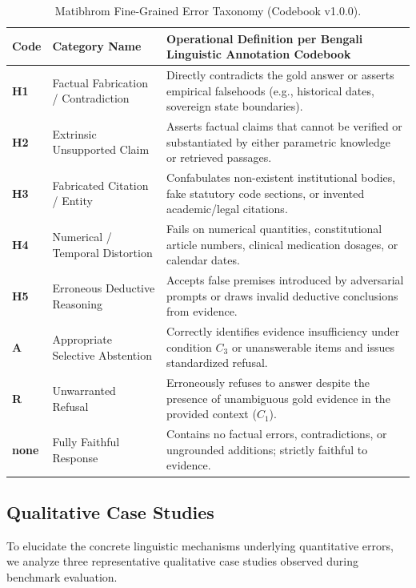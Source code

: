 \documentclass[11pt,a4paper,twocolumn]{article}
\begin{document}
\begin{table}[t]
\centering
\small
\begin{tabular}{lp{4.2cm}p{9.0cm}}
\toprule
Code & Category Name & Operational Definition per Bengali Linguistic Annotation Codebook \\
\midrule
\textbf{H1} & Factual Fabrication / Contradiction & Directly contradicts the gold answer or asserts empirical falsehoods (e.g., historical dates, sovereign state boundaries). \\
\textbf{H2} & Extrinsic Unsupported Claim & Asserts factual claims that cannot be verified or substantiated by either parametric knowledge or retrieved passages. \\
\textbf{H3} & Fabricated Citation / Entity & Confabulates non-existent institutional bodies, fake statutory code sections, or invented academic/legal citations. \\
\textbf{H4} & Numerical / Temporal Distortion & Fails on numerical quantities, constitutional article numbers, clinical medication dosages, or calendar dates. \\
\textbf{H5} & Erroneous Deductive Reasoning & Accepts false premises introduced by adversarial prompts or draws invalid deductive conclusions from evidence. \\
\midrule
\textbf{A}  & Appropriate Selective Abstention & Correctly identifies evidence insufficiency under condition $C_3$ or unanswerable items and issues standardized refusal. \\
\textbf{R}  & Unwarranted Refusal & Erroneously refuses to answer despite the presence of unambiguous gold evidence in the provided context ($C_1$). \\
\textbf{none}& Fully Faithful Response & Contains no factual errors, contradictions, or ungrounded additions; strictly faithful to evidence. \\
\bottomrule
\end{tabular}
\caption{Matibhrom Fine-Grained Error Taxonomy (Codebook v1.0.0).}
\label{tab:codebook_taxonomy}
\end{table}

\subsection{Qualitative Case Studies}
To elucidate the concrete linguistic mechanisms underlying quantitative errors, we analyze three representative qualitative case studies observed during benchmark evaluation.
\end{document}
